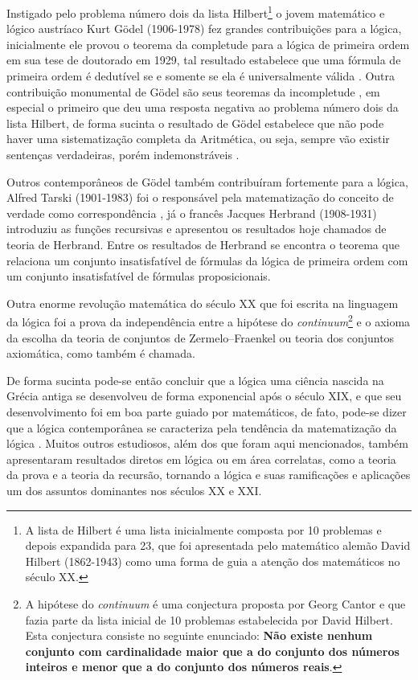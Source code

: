 Instigado pelo problema número dois da lista Hilbert\footnote{A lista de Hilbert é uma lista inicialmente composta por 10 problemas e depois expandida para 23, que foi apresentada pelo matemático alemão David Hilbert (1862-1943) como uma forma de guia a atenção dos matemáticos no século XX.} o jovem matemático e lógico austríaco Kurt Gödel (1906-1978) fez grandes contribuições para a lógica, inicialmente ele provou o teorema da completude para a lógica de primeira ordem em sua tese de doutorado em 1929, tal resultado estabelece que uma fórmula de primeira ordem é dedutível se e somente se ela é universalmente válida \cite{benja-Logica}. Outra contribuição monumental de Gödel são seus teoremas da incompletude \cite{godel1931}, em especial o primeiro que deu uma resposta negativa ao problema número dois da lista Hilbert, de forma sucinta o resultado de Gödel estabelece que não pode haver uma sistematização completa da Aritmética, ou seja, sempre vão existir sentenças verdadeiras, porém indemonstráveis \cite{abe2002-logica, magnus2020}.

Outros contemporâneos de Gödel também contribuíram fortemente para a lógica, Alfred Tarski (1901-1983) foi o responsável pela matematização do conceito de verdade como correspondência \cite{abe2002-logica, tarski1983}, já o francês Jacques Herbrand (1908-1931) introduziu as funções recursivas e apresentou os resultados hoje chamados de teoria de Herbrand. Entre os resultados de Herbrand se encontra o teorema que relaciona um conjunto insatisfatível de fórmulas da lógica de primeira ordem com um conjunto insatisfatível de fórmulas proposicionais.

Outra enorme revolução matemática do século XX que foi escrita na linguagem da lógica foi a prova da independência entre a hipótese do \textit{continuum}\footnote{A hipótese do \textit{continuum} é uma conjectura proposta por Georg Cantor e que fazia parte da lista inicial de 10 problemas estabelecida por David Hilbert. Esta conjectura consiste no seguinte enunciado: \textbf{Não existe nenhum conjunto com cardinalidade maior que a do conjunto dos números inteiros e menor que a do conjunto dos números reais}.} e o axioma da escolha da teoria de conjuntos de Zermelo–Fraenkel ou teoria dos conjuntos axiomática, como também é chamada.

De forma sucinta pode-se então concluir que a lógica uma ciência nascida na Grécia antiga se desenvolveu de forma exponencial após o século XIX, e que seu desenvolvimento foi em boa parte guiado por matemáticos, de fato, pode-se dizer que a lógica contemporânea se caracteriza pela tendência da matematização da lógica \cite{barreto}. Muitos outros estudiosos, além dos que foram aqui mencionados, também apresentaram resultados diretos em lógica ou em área correlatas, como a teoria da prova e a teoria da recursão, tornando a lógica e suas ramificações e aplicações um dos assuntos dominantes nos séculos XX e XXI.

